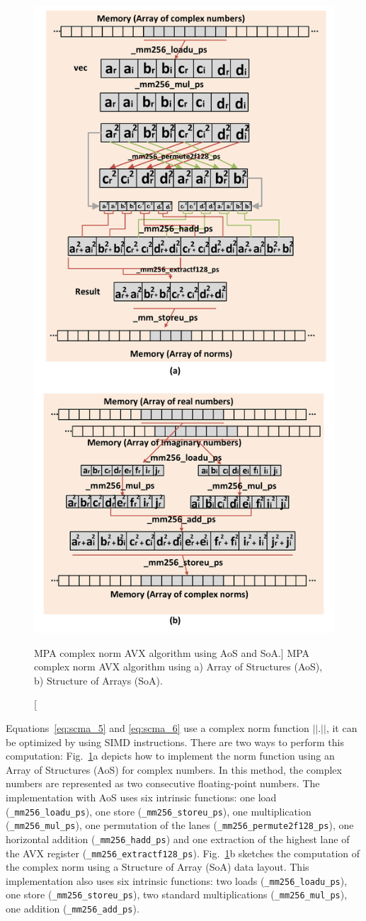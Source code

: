 \begin{figure}[htp]
  \centering
  \includegraphics[width=0.70\linewidth]{scma/simd_norm/simd_norm}
  \caption
    [MPA complex norm AVX algorithm using AoS and SoA.]
    {MPA complex norm AVX algorithm using
     a) Array of Structures (AoS),
     b) Structure of Arrays (SoA).}
  \label{fig:scma_simd_norm}
\end{figure}

Equations~\eqref{eq:scma_5} and \eqref{eq:scma_6} use a complex norm function
$||.||$, it can be optimized by using SIMD instructions. There are two ways to
perform this computation: Fig.~\ref{fig:scma_simd_norm}a depicts how to
implement the norm function using an Array of Structures (AoS) for complex
numbers. In this method, the complex numbers are represented as two consecutive
floating-point numbers. The implementation with AoS uses six intrinsic
functions: one load (\verb|_mm256_loadu_ps|), one store
(\verb|_mm256_storeu_ps|), one multiplication (\verb|_mm256_mul_ps|), one
permutation of the lanes (\verb|_mm256_permute2f128_ps|), one horizontal
addition (\verb|_mm256_hadd_ps|) and one extraction of the highest lane of the
AVX register (\verb|_mm256_extractf128_ps|). Fig.~\ref{fig:scma_simd_norm}b
sketches the computation of the complex norm using a Structure of Array (SoA)
data layout. This implementation also uses six intrinsic functions: two loads
(\verb|_mm256_loadu_ps|), one store (\verb|_mm256_storeu_ps|), two standard
multiplications (\verb|_mm256_mul_ps|), one addition (\verb|_mm256_add_ps|).

